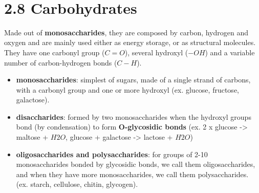\documentclass[a4paper,landscape,10pt]{cheatsheet}
\begin{document}
\hfil\\
\section*{2.8 Carbohydrates}
Made out of \textbf{monosaccharides}, they are composed by carbon, hydrogen and oxygen and are mainly used either as
energy storage, or as structural molecules.\\
They have one carbonyl group ($C=O$), several hydroxyl ($-OH$) and a variable number of carbon-hydrogen bonds ($C-H$).\\
\begin{itemize}
      \item \textbf{monosaccharides}: simplest of sugars, made of a single strand of carbons, with a carbonyl group and one
            or more hydroxyl (ex. glucose, fructose, galactose).
      \item \textbf{disaccharides}: formed by two monosaccharides when the hydroxyl groups bond (by condensation) to form
            \textbf{O-glycosidic bonds} (ex. 2 x glucose -> maltose + $H2O$, glucose + galactose -> lactose + $H2O$)
      \item \textbf{oligosaccharides and polysaccharides}: for groups of 2-10 monosaccharides bonded by glycosidic bonds, we
            call them oligosaccharides, and when they have more monosaccharides, we call them polysaccharides. (ex. starch,
            cellulose, chitin, glycogen).
\end{itemize}

\hfill\\
\end{document}
